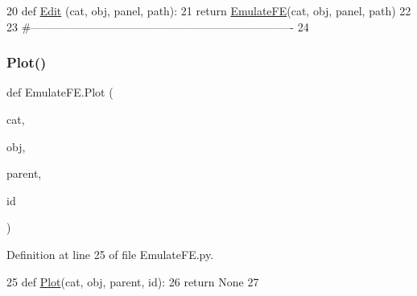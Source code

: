 \begin{DoxyCode}
20 \textcolor{keyword}{def }\hyperlink{namespaceEmulateFE_acf6d71e0a6b073fbe4fa9a9e82316745}{Edit} (cat, obj, panel, path):
21     \textcolor{keywordflow}{return} \hyperlink{classEmulateFE}{EmulateFE}(cat, obj, panel, path)
22 
23 \textcolor{comment}{#----------------------------------------------------------------------}
24 
\end{DoxyCode}
\mbox{\label{namespaceEmulateFE_abf2cc9ef25368158e094f1ac010185d2}} 
\subsubsection{\texorpdfstring{Plot()}{Plot()}}
{\footnotesize\ttfamily def Emulate\+F\+E.\+Plot (\begin{DoxyParamCaption}\item[{}]{cat,  }\item[{}]{obj,  }\item[{}]{parent,  }\item[{}]{id }\end{DoxyParamCaption})}



Definition at line 25 of file Emulate\+F\+E.\+py.


\begin{DoxyCode}
25 \textcolor{keyword}{def }\hyperlink{namespaceEmulateFE_abf2cc9ef25368158e094f1ac010185d2}{Plot}(cat, obj, parent, id):
26     \textcolor{keywordflow}{return} \textcolor{keywordtype}{None}
27 \end{DoxyCode}

